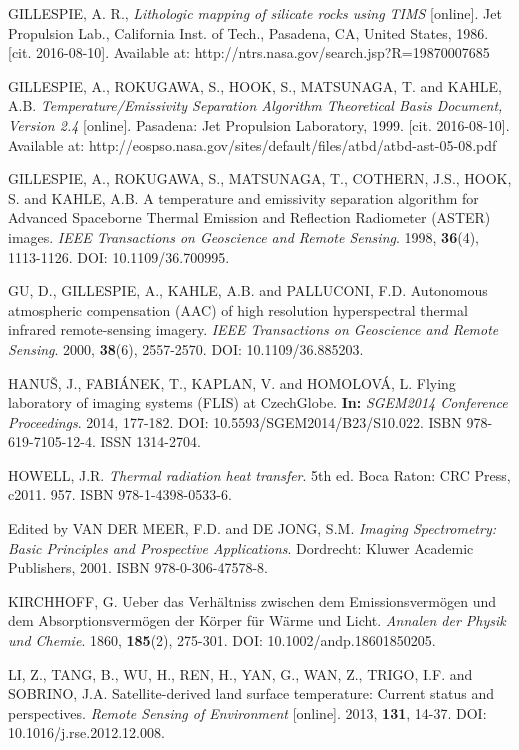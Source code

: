 \begin{thebibliography}{10}
 GILLESPIE, A. R., \textit{Lithologic mapping of silicate rocks using TIMS} [online]. Jet Propulsion Lab., California Inst. of Tech., Pasadena, CA, United States, 1986. [cit. 2016-08-10]. Available at: http://ntrs.nasa.gov/search.jsp?R=19870007685

 GILLESPIE, A., ROKUGAWA, S., HOOK, S., MATSUNAGA, T. and KAHLE, A.B. \textit{Temperature/Emissivity Separation Algorithm Theoretical Basis Document, Version 2.4} [online]. Pasadena: Jet Propulsion Laboratory, 1999. [cit. 2016-08-10]. Available at: http://eospso.nasa.gov/sites/default/files/atbd/atbd-ast-05-08.pdf 

 GILLESPIE, A., ROKUGAWA, S., MATSUNAGA, T., COTHERN, J.S., HOOK, S. and KAHLE, A.B. A temperature and emissivity separation algorithm for Advanced Spaceborne Thermal Emission and Reflection Radiometer (ASTER) images. \textit{IEEE Transactions on Geoscience and Remote Sensing}. 1998, \textbf{36}(4), 1113-1126. DOI: 10.1109/36.700995.

 GU, D., GILLESPIE, A., KAHLE, A.B. and PALLUCONI, F.D. Autonomous atmospheric compensation (AAC) of high resolution hyperspectral thermal infrared remote-sensing imagery. \textit{IEEE Transactions on Geoscience and Remote Sensing}. 2000, \textbf{38}(6), 2557-2570. DOI: 10.1109/36.885203.

 HANUŠ, J., FABIÁNEK, T., KAPLAN, V. and HOMOLOVÁ, L. Flying laboratory of imaging systems (FLIS) at CzechGlobe. \textbf{In:} \textit{SGEM2014 Conference Proceedings}. 2014, 177-182. DOI: 10.5593/SGEM2014/B23/S10.022. ISBN 978-619-7105-12-4. ISSN 1314-2704.

 HOWELL, J.R. \textit{Thermal radiation heat transfer}. 5th ed. Boca Raton: CRC Press, c2011. 957. ISBN 978-1-4398-0533-6.

 Edited by VAN DER MEER, F.D. and DE JONG, S.M. \textit{Imaging Spectrometry: Basic Principles and Prospective Applications}. Dordrecht: Kluwer Academic Publishers, 2001. ISBN 978-0-306-47578-8.

 KIRCHHOFF, G. Ueber das Verhältniss zwischen dem Emissionsvermögen und dem Absorptionsvermögen der Körper für Wärme und Licht. \textit{Annalen der Physik und Chemie}. 1860, \textbf{185}(2), 275-301. DOI: 10.1002/andp.18601850205.

 LI, Z., TANG, B., WU, H., REN, H., YAN, G., WAN, Z., TRIGO, I.F. and SOBRINO, J.A. Satellite-derived land surface temperature: Current status and perspectives. \textit{Remote Sensing of Environment} [online]. 2013, \textbf{131}, 14-37. DOI: 10.1016/j.rse.2012.12.008.


\end{thebibliography}
